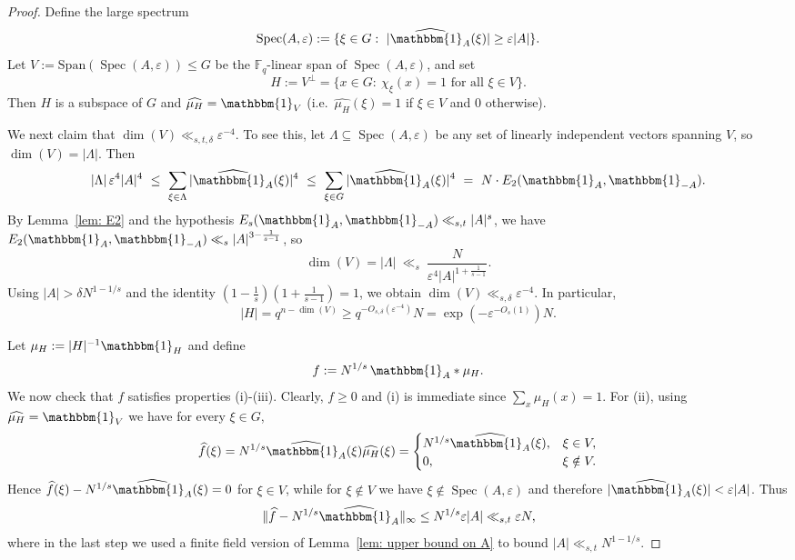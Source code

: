 \documentclass[A4paper,reqno,oneside,12pt]{amsart}
\theoremstyle{plain}
\theoremstyle{definition}
\newcommand{\e}{\mathbbm{1}}          %
\newcommand{\F}{\mathbb{F}}
\begin{document}
\begin{proof}
Define the large spectrum
\[
\operatorname{Spec}(A,\varepsilon):=\{\xi\in G:\ |\widehat{\e_A}(\xi)|\ge \varepsilon |A|\}.
\]
Let $V:=\mathrm{Span}(\operatorname{Spec}(A,\varepsilon))\le G$ be the $\F_q$-linear span of $\operatorname{Spec}(A,\varepsilon)$, and set
\[
H:=V^\perp=\{x\in G:\ \chi_\xi(x)=1 \text{ for all }\xi\in V\}.
\]
Then $H$ is a subspace of $G$ and $\widehat{\mu_H}=\e_V$ (i.e.\ $\widehat{\mu_H}(\xi)=1$ if
$\xi\in V$ and $0$ otherwise).

We next claim that $\dim(V)\ll_{s,t,\delta}\varepsilon^{-4}$. To see this, let $\Lambda\subseteq \operatorname{Spec}(A,\varepsilon)$ be any set of linearly independent vectors spanning
$V$, so $\dim(V)=|\Lambda|$.  Then
\[
|\Lambda|\,\varepsilon^4|A|^4\ \le\ \sum_{\xi\in\Lambda}|\widehat{\e_A}(\xi)|^4
\ \le\ \sum_{\xi\in G}|\widehat{\e_A}(\xi)|^4
\ =\ N\cdot E_2(\e_A,\e_{-A}).
\]
By Lemma~\ref{lem: E2} and the hypothesis
$E_s(\e_A,\e_{-A})\ll_{s,t}|A|^s$, we have
$E_2(\e_A,\e_{-A})\ll_s |A|^{3-\frac{1}{s-1}}$, so
\[
\dim(V) = |\Lambda| \ \ll_s\ \frac{N}{\varepsilon^4|A|^{1+\frac{1}{s-1}}}.
\]
Using $|A|>\delta N^{1-1/s}$ and the identity
$(1-\tfrac1s)(1+\tfrac{1}{s-1})=1$, we obtain $\dim(V)\ll_{s,\delta}\varepsilon^{-4}$.
In particular,
\begin{equation}\label{eqn: H}
|H|=q^{n-\dim(V)}\ge q^{-O_{s,\delta}(\varepsilon^{-4})}N=\exp(-\varepsilon^{-O_s(1)})N.    
\end{equation}

Let $\mu_H:=|H|^{-1}\e_H$ and define
\[
f:=N^{1/s}\,\e_A*\mu_H.
\]
We now check that $f$ satisfies properties (i)-(iii). Clearly, $f\ge0$ and (i) is immediate since $\sum_x \mu_H(x)=1$. For (ii), using $\widehat{\mu_H}=\e_V$ we have for every $\xi\in G$,
\[
\widehat f(\xi)=N^{1/s}\widehat{\e_A}(\xi)\widehat{\mu_H}(\xi)
=
\begin{cases}
N^{1/s}\widehat{\e_A}(\xi),& \xi\in V,\\
0,& \xi\notin V.
\end{cases}
\]
Hence $\widehat f(\xi)-N^{1/s}\widehat{\e_A}(\xi)=0$ for $\xi\in V$, while for $\xi\notin V$ we have
$\xi\notin \operatorname{Spec}(A,\varepsilon)$ and therefore $|\widehat{\e_A}(\xi)|<\varepsilon|A|$.  Thus
\[
\|\widehat f-N^{1/s}\widehat{\e_A}\|_\infty
\le N^{1/s}\varepsilon|A|
\ll_{s,t}\varepsilon N,
\]
where in the last step we used a finite field version of  Lemma~\ref{lem: upper bound on A} to bound $|A|\ll_{s,t}N^{1-1/s}$.


\end{proof}
\end{document}

